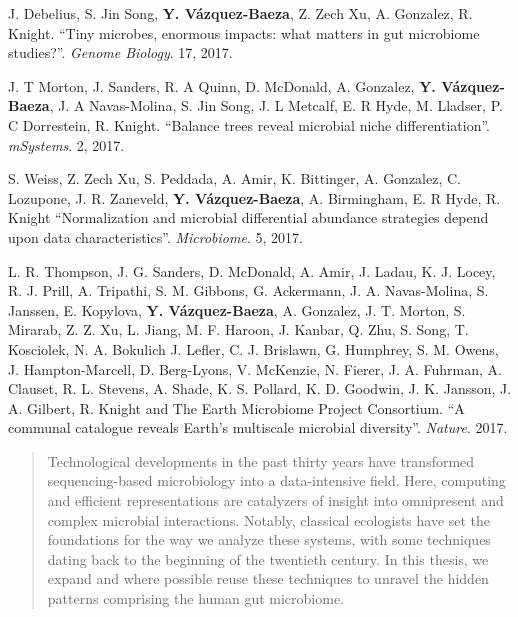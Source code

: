 \begin{frontmatter}
\begin{vitapage}
\begin{publications}
    \item J. Debelius, S. Jin Song, \textbf{Y. V\'azquez-Baeza}, Z. Zech Xu, A. Gonzalez, R. Knight. ``Tiny microbes, enormous impacts: what matters in gut microbiome studies?''. \emph{Genome Biology}. 17, 2017.

    \item J. T Morton, J. Sanders, R. A Quinn, D. McDonald, A. Gonzalez, \textbf{Y. V\'azquez-Baeza}, J. A Navas-Molina, S. Jin Song, J. L Metcalf, E. R Hyde, M. Lladser, P. C Dorrestein, R. Knight. ``Balance trees reveal microbial niche differentiation''. \emph{mSystems}. 2, 2017.

    \item S. Weiss, Z. Zech Xu, S. Peddada, A. Amir, K. Bittinger, A. Gonzalez, C. Lozupone, J. R. Zaneveld, \textbf{Y. V\'azquez-Baeza}, A. Birmingham, E. R Hyde, R. Knight ``Normalization and microbial differential abundance strategies depend upon data characteristics''. \emph{Microbiome}. 5, 2017.

    \item L. R. Thompson, J. G. Sanders, D. McDonald, A. Amir, J. Ladau, K. J.  
        Locey, R. J. Prill, A. Tripathi, S. M.  Gibbons, G. Ackermann, J. A.  
        Navas-Molina, S. Janssen, E. Kopylova, \textbf{Y. V\'azquez-Baeza}, A.  
        Gonzalez, J. T. Morton, S. Mirarab, Z. Z. Xu, L. Jiang, M. F.  Haroon, 
        J.  Kanbar, Q.  Zhu, S. Song, T. Kosciolek, N. A. Bokulich J. Lefler, 
        C. J.  Brislawn, G. Humphrey, S. M. Owens, J. Hampton-Marcell, D.  
        Berg-Lyons, V. McKenzie, N. Fierer, J. A. Fuhrman, A. Clauset, R. L.  
        Stevens, A.  Shade, K. S. Pollard, K. D. Goodwin, J. K. Jansson, J. A.  
        Gilbert, R.  Knight and The Earth Microbiome Project Consortium. ``A 
        communal catalogue reveals Earth’s multiscale microbial diversity''.
        \emph{Nature}. 2017.
\end{publications}

\end{vitapage}


%
%
\begin{abstract}

    Technological developments in the past thirty years have transformed 
    sequencing\hyp{}based microbiology into a data-intensive field. Here, 
    computing and efficient representations are catalyzers of insight into 
    omnipresent and complex microbial interactions. Notably, classical 
    ecologists have set the foundations for the way we analyze these systems, 
    with some techniques dating back to the beginning of the twentieth century.  
    In this thesis, we expand and where possible reuse these techniques to 
    unravel the hidden patterns comprising the human gut microbiome.


\end{abstract}
\end{frontmatter}
